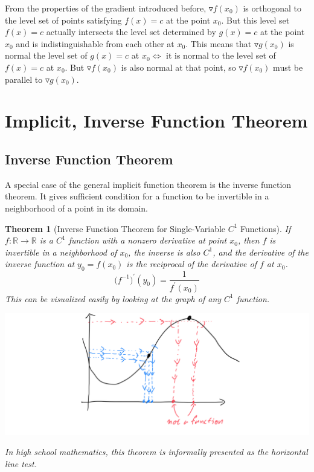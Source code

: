 \documentclass{article}
\newtheorem{theorem}{Theorem}[section]
\theoremstyle{remark}
\theoremstyle{definition}
\begin{document}
From the properties of the gradient introduced before, $\triangledown f(x_0)$ is orthogonal to the level set of points satisfying $f(x) = c$ at the point $x_0$. But this level set $f(x) = c$ actually intersects the level set determined by $g(x) = c$ at the point $x_0$ and is indistinguishable from each other at $x_0$. This means that $\triangledown g(x_0)$ is normal the level set of $g(x) = c$ at $x_0 \iff $ it is normal to the level set of $f(x) = c$ at $x_0$. But $\triangledown f(x_0)$ is also normal at that point, so $\triangledown f(x_0)$ must be parallel to $\triangledown g(x_0)$. 


\section{Implicit, Inverse Function Theorem}

\subsection{Inverse Function Theorem}
A special case of the general implicit function theorem is the inverse function theorem. It gives sufficient condition for a function to be invertible in a neighborhood of a point in its domain. 

\begin{theorem}[Inverse Function Theorem for Single-Variable $C^1$ Functions]
If $f: \mathbb{R} \longrightarrow \mathbb{R}$ is a $C^1$ function with a nonzero derivative at point $x_0$, then $f$ is invertible in a neighborhood of $x_0$, the inverse is also $C^1$, and the derivative of the inverse function at $y_0 = f(x_0)$ is the reciprocal of the derivative of $f$ at $x_0$. 
\[\big( f^{-1}\big)^\prime (y_0) = \frac{1}{f^\prime (x_0)}\]
This can be visualized easily by looking at the graph of any $C^1$ function. 
\begin{center}
    \includegraphics[scale=0.25]{img/Inverse_Function_Theorem_One_Variable.PNG}
\end{center}
In high school mathematics, this theorem is informally presented as the \textit{horizontal line test}. 
\end{theorem}
\end{document}
